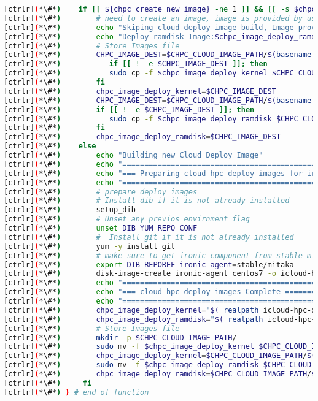 \begin{lstlisting}[language=bash,keywords={}]
[ctrlr](*\#*)    if [[ ${chpc_create_new_image} -ne 1 ]] && [[ -s $chpc_image_deploy_kernel ]] && [[ -s $chpc_image_deploy_ramdisk ]]; then
[ctrlr](*\#*)        # need to create an image, image is provided by user
[ctrlr](*\#*)        echo "Skiping cloud deploy-image build, Image provided:"
[ctrlr](*\#*)        echo "Deploy ramdisk Image:$chpc_image_deploy_ramdisk"
[ctrlr](*\#*)        # Store Images file
[ctrlr](*\#*)        CHPC_IMAGE_DEST=$CHPC_CLOUD_IMAGE_PATH/$(basename $chpc_image_deploy_kernel)
[ctrlr](*\#*)           if [[ ! -e $CHPC_IMAGE_DEST ]]; then
[ctrlr](*\#*)           sudo cp -f $chpc_image_deploy_kernel $CHPC_CLOUD_IMAGE_PATH/
[ctrlr](*\#*)        fi
[ctrlr](*\#*)        chpc_image_deploy_kernel=$CHPC_IMAGE_DEST
[ctrlr](*\#*)        CHPC_IMAGE_DEST=$CHPC_CLOUD_IMAGE_PATH/$(basename $chpc_image_deploy_ramdisk)
[ctrlr](*\#*)        if [[ ! -e $CHPC_IMAGE_DEST ]]; then
[ctrlr](*\#*)           sudo cp -f $chpc_image_deploy_ramdisk $CHPC_CLOUD_IMAGE_PATH/
[ctrlr](*\#*)        fi
[ctrlr](*\#*)        chpc_image_deploy_ramdisk=$CHPC_IMAGE_DEST
[ctrlr](*\#*)    else
[ctrlr](*\#*)        echo "Building new Cloud Deploy Image"
[ctrlr](*\#*)        echo "====================================================================="
[ctrlr](*\#*)        echo "=== Preparing cloud-hpc deploy images for ironic====================="
[ctrlr](*\#*)        echo "====================================================================="
[ctrlr](*\#*)        # prepare deploy images
[ctrlr](*\#*)        # Install dib if it is not already installed
[ctrlr](*\#*)        setup_dib
[ctrlr](*\#*)        # Unset any previos envirnment flag
[ctrlr](*\#*)        unset DIB_YUM_REPO_CONF   
[ctrlr](*\#*)        #  Install git if it is not already installed
[ctrlr](*\#*)        yum -y install git
[ctrlr](*\#*)        # make sure to get ironic component from stable mitaka release
[ctrlr](*\#*)		 export DIB_REPOREF_ironic_agent=stable/mitaka
[ctrlr](*\#*)        disk-image-create ironic-agent centos7 -o icloud-hpc-deploy-c7
[ctrlr](*\#*)        echo "====================================================================="
[ctrlr](*\#*)        echo "=== cloud-hpc deploy images Complete ================================"
[ctrlr](*\#*)        echo "====================================================================="
[ctrlr](*\#*)        chpc_image_deploy_kernel="$( realpath icloud-hpc-deploy-c7.kernel)"
[ctrlr](*\#*)        chpc_image_deploy_ramdisk="$( realpath icloud-hpc-deploy-c7.initramfs)"
[ctrlr](*\#*)        # Store Images file
[ctrlr](*\#*)        mkdir -p $CHPC_CLOUD_IMAGE_PATH/
[ctrlr](*\#*)        sudo mv -f $chpc_image_deploy_kernel $CHPC_CLOUD_IMAGE_PATH/
[ctrlr](*\#*)        chpc_image_deploy_kernel=$CHPC_CLOUD_IMAGE_PATH/$(basename $chpc_image_deploy_kernel)
[ctrlr](*\#*)        sudo mv -f $chpc_image_deploy_ramdisk $CHPC_CLOUD_IMAGE_PATH/
[ctrlr](*\#*)        chpc_image_deploy_ramdisk=$CHPC_CLOUD_IMAGE_PATH/$(basename $chpc_image_deploy_ramdisk)
[ctrlr](*\#*)     fi
[ctrlr](*\#*) } # end of function
\end{lstlisting}





